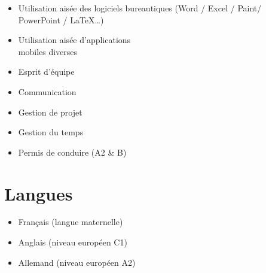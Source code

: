 \documentclass[9pt, oneside, a4paper, titlepage]{extarticle}
\begin{document}
\begin{tcolorbox}
\begin{minipage}[t]{6.2cm}
\begin{spacing}{0.95}
\begin{tcolorbox}[grow to left by = 0.6cm, colback = gray!25, colframe = white]
                \begin{itemize}
                    \vspace*{0.2cm}
                    \item Utilisation aisée des logiciels bureautiques (Word / Excel / Paint/ \\PowerPoint / \LaTeX \ldots)
                    \vspace*{0.2cm}
                    \item Utilisation aisée d’applications \\mobiles diverses
                    \vspace*{0.2cm}
                    \item Esprit d'équipe                    
                    \vspace*{0.2cm}
                    \item Communication
                    \vspace*{0.2cm}
                    \item Gestion de projet
                    \vspace*{0.2cm}
                    \item Gestion du temps
                    \vspace*{0.2cm}
                    \item Permis de conduire (A2 \& B)
                \end{itemize}


                \vspace*{0.2cm}
                
                \section*{Langues}
                \begin{itemize}
                    \item Français (langue maternelle)
                    \item Anglais (niveau européen C1)
                    \item Allemand (niveau européen A2)
                \end{itemize}
                \vspace*{0.51cm}

            \end{tcolorbox}
        \end{spacing}
        \end{minipage}
        \hspace*{0.4mm}
        \begin{minipage}[t]{12.8cm}
            \vspace*{-0.5cm}
            \begin{tcolorbox}[grow to right by = 0.6cm, colback = gray!25, colframe = white]

\end{tcolorbox}
\end{minipage}
\end{tcolorbox}
\end{document}
